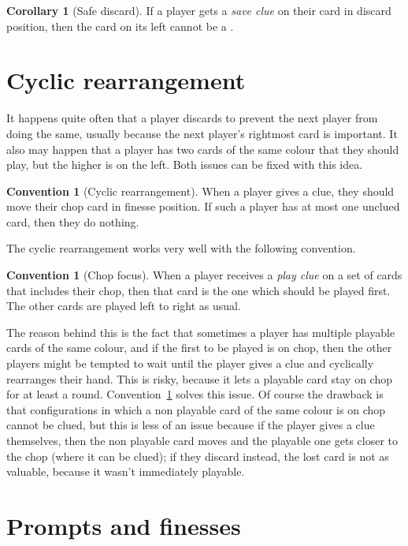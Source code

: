 \documentclass[a4paper]{article}
\theoremstyle{plain}
\theoremstyle{definition}
\newtheorem{corollary}[theorem]{Corollary}
\newtheorem{convention}[theorem]{Convention}
\begin{document}
\begin{corollary}[Safe discard]
	If a player gets a \textit{save clue} on their card in discard position, then the card on its left cannot be a .
\end{corollary}

\section{Cyclic rearrangement}

It happens quite often that a player discards to prevent the next player from doing the same, usually because the next player's rightmost card is important. It also may happen that a player has two cards of the same colour that they should play, but the higher is on the left. Both issues can be fixed with this idea.

\begin{convention}[Cyclic rearrangement]
	When a player gives a clue, they should move their chop card in finesse position. If such a player has at most one unclued card, then they do nothing.
\end{convention}

 The cyclic rearrangement works very well with the following convention.

\begin{convention}[Chop focus]
	\label{chop-focus}
	When a player receives a \emph{play clue} on a set of cards that includes their chop, then that card is the one which should be played first. The other cards are played left to right as usual.
\end{convention}

The reason behind this is the fact that sometimes a player has multiple playable cards of the same colour, and if the first to be played is on chop, then the other players might be tempted to wait until the player gives a clue and cyclically rearranges their hand. This is risky, because it lets a playable card stay on chop for at least a round. Convention~\ref{chop-focus} solves this issue. Of course the drawback is that configurations in which a non playable card of the same colour is on chop cannot be clued, but this is less of an issue because if the player gives a clue themselves, then the non playable card moves and the playable one gets closer to the chop (where it can be clued); if they discard instead, the lost card is not as valuable, because it wasn't immediately playable.

\section{Prompts and finesses}
\end{document}
